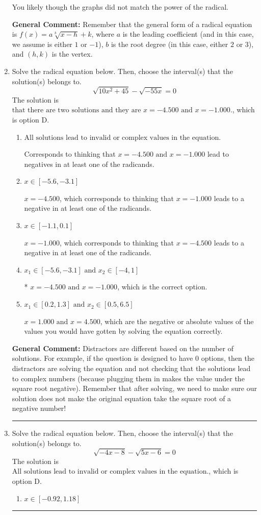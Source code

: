 \documentclass{extbook}[14pt]
\newcommand{\litem}[1]{\item #1

\rule{\textwidth}{0.4pt}}
\begin{document}
\begin{enumerate}
{\begin{enumerate}[label=\Alph*.]
You likely though the graphs did not match the power of the radical.
\end{enumerate}

\textbf{General Comment:} Remember that the general form of a radical equation is $ f(x) = a \sqrt[b]{x - h} + k$, where $a$ is the leading coefficient (and in this case, we assume is either $1$ or $-1$), $b$ is the root degree (in this case, either $2$ or $3$), and $(h, k)$ is the vertex.
}
\litem{
Solve the radical equation below. Then, choose the interval(s) that the solution(s) belongs to.
\[ \sqrt{10 x^2 + 45} - \sqrt{-55 x} = 0 \]The solution is \( \text{that there are two solutions and they are } x = -4.500 \text{ and } x = -1.000. \), which is option D.\begin{enumerate}[label=\Alph*.]
\item \( \text{All solutions lead to invalid or complex values in the equation.} \)

Corresponds to thinking that $x = -4.500 \text{ and } x = -1.000$ lead to negatives in at least one of the radicands.
\item \( x \in [-5.6,-3.1] \)

$x = -4.500$, which corresponds to thinking that $x = -1.000$ leads to a negative in at least one of the radicands.
\item \( x \in [-1.1,0.1] \)

$x = -1.000$, which corresponds to thinking that $x = -4.500$ leads to a negative in at least one of the radicands.
\item \( x_1 \in [-5.6, -3.1] \text{ and } x_2 \in [-4,1] \)

* $x = -4.500 \text{ and } x = -1.000$, which is the correct option.
\item \( x_1 \in [0.2, 1.3] \text{ and } x_2 \in [0.5,6.5] \)

$x = 1.000 \text{ and } x = 4.500$, which are the negative or absolute values of the values you would have gotten by solving the equation correctly.
\end{enumerate}

\textbf{General Comment:} Distractors are different based on the number of solutions. For example, if the question is designed to have 0 options, then the distractors are solving the equation and not checking that the solutions lead to complex numbers (because plugging them in makes the value under the square root negative). Remember that after solving, we need to make sure our solution does not make the original equation take the square root of a negative number!
}
\litem{
Solve the radical equation below. Then, choose the interval(s) that the solution(s) belongs to.
\[ \sqrt{-4 x - 8} - \sqrt{5 x - 6} = 0 \]The solution is \( \text{All solutions lead to invalid or complex values in the equation.} \), which is option D.\begin{enumerate}[label=\Alph*.]
\item \( x \in [-0.92,1.18] \)


\end{enumerate}}
\end{enumerate}
\end{document}
